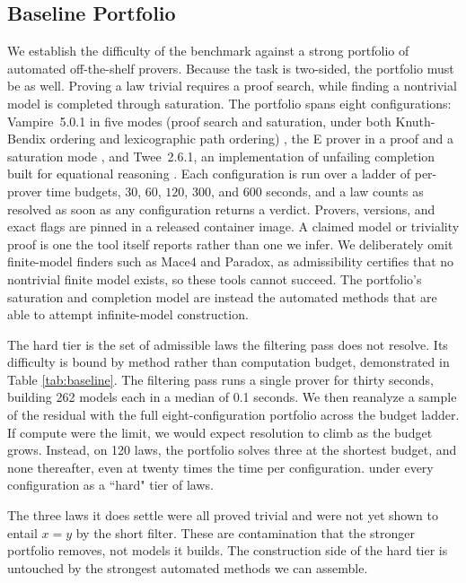 \documentclass[letterpaper]{article} %
\begin{document}
\subsection{Baseline Portfolio}
We establish the difficulty of the benchmark against a strong portfolio of automated off-the-shelf provers. Because the task is two-sided, the portfolio must be as well. Proving a law trivial requires a proof search, while finding a nontrivial model is completed through saturation. The portfolio spans eight configurations: Vampire~5.0.1 in five modes (proof search and saturation, under both Knuth-Bendix ordering and lexicographic path ordering) \citep{...}, the E prover in a proof and a saturation mode \citep{...}, and Twee~2.6.1, an implementation of unfailing completion built for equational reasoning \citep{...}. Each configuration is run over a ladder of per-prover time budgets, $30$, $60$, $120$, $300$, and $600$ seconds, and a law counts as resolved as soon as any configuration returns a verdict. Provers, versions, and exact flags are pinned in a released container image. A claimed model or triviality proof is one the tool itself reports rather than one we infer. We deliberately omit finite-model finders such as Mace4 and Paradox, as admissibility certifies that no nontrivial finite model exists, so these tools cannot succeed. The portfolio's saturation and completion model are instead the automated methods that are able to attempt infinite-model construction. 


The hard tier is the set of admissible laws the filtering pass does not resolve. Its difficulty is bound by method rather than computation budget, demonstrated in Table \ref{tab:baseline}. The filtering pass runs a single prover for thirty seconds, building 262 models each in a median of 0.1 seconds. We then reanalyze a sample of the residual with the full eight-configuration portfolio across the budget ladder. If compute were the limit, we would expect resolution to climb as the budget grows. Instead, on 120 laws, the portfolio solves three at the shortest budget, and none thereafter, even at twenty times the time per configuration. 
under every configuration as a ``hard" tier of laws.

The three laws it does settle were all proved trivial and were not yet shown to entail $x = y$ by the short filter. These are contamination that the stronger portfolio removes, not models it builds. The construction side of the hard tier is untouched by the strongest automated methods we can assemble. 
\end{document}

